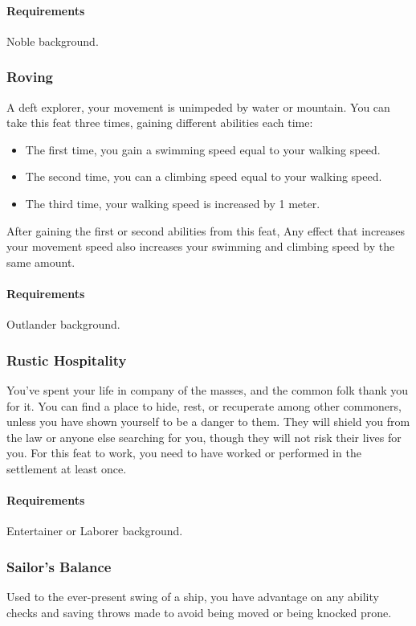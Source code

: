     \paragraph{Requirements} Noble background.
\subsubsection{Roving} \label{feat::roving}
    A deft explorer, your movement is unimpeded by water or mountain.
    You can take this feat three times, gaining different abilities each time:
    \begin{itemize}
        \item The first time, you gain a swimming speed equal to your walking speed.
        \item The second time, you can a climbing speed equal to your walking speed.
        \item The third time, your walking speed is increased by 1 meter.
    \end{itemize}
    After gaining the first or second abilities from this feat, Any effect that increases your movement speed also increases your swimming and climbing speed by the same amount.
    \paragraph{Requirements} Outlander background.
\subsubsection{Rustic Hospitality} \label{feat::rustichospitality}
    You've spent your life in company of the masses, and the common folk thank you for it.
    You can find a place to hide, rest, or recuperate among other commoners, unless you have shown yourself to be a danger to them.
    They will shield you from the law or anyone else searching for you, though they will not risk their lives for you.
    For this feat to work, you need to have worked or performed in the settlement at least once.
    \paragraph{Requirements} Entertainer or Laborer background.
\subsubsection{Sailor's Balance} \label{feat::sailorsbalance}
    Used to the ever-present swing of a ship, you have advantage on any ability checks and saving throws made to avoid being moved or being knocked prone.
